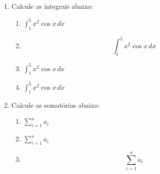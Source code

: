 \documentclass[a4paper, 12pt]{article}
\newcommand{\integral}{\displaystyle\int}
\begin{document}
\begin{enumerate}
    \item Calcule as integrais abaixo:
    
    \begin{enumerate}
        \item $\int_1^5 x^2\cos x \,dx$ %
        \item $$\int_1^5 x^2\cos x \,dx$$ %
        \item $\displaystyle\int_1^5 x^2\cos x \,dx$ %
        \item $\integral_1^5 x^2\cos x \, dx$

    \end{enumerate}
    
    \item Calcule as somatórias abaixo:
    
    \begin{enumerate}
        \item $\sum_{i=1}^n a_i$ %
        \item $\displaystyle\sum_{i=1}^n a_i$ %
        \item $$\sum_{i=1}^n a_i$$
    \end{enumerate}
    
\end{enumerate}
\end{document}
